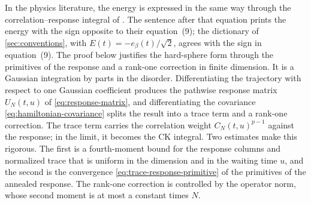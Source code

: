 In the physics literature, the energy is expressed in the same way through the correlation--response integral of \cite[Equation~(5)]{ck1993}. The sentence after that equation prints the energy with the sign opposite to their equation~(9); the dictionary of \cref{sec:conventions}, with $E(t)=-e_\beta(t)/\sqrt2$, agrees with the sign in equation~(9). The proof below justifies the hard-sphere form through the primitives of the response and a rank-one correction in finite dimension. It is a Gaussian integration by parts in the disorder. Differentiating the trajectory with respect to one Gaussian coefficient produces the pathwise response matrix $U_N(t,u)$ of \eqref{eq:response-matrix}, and differentiating the covariance \eqref{eq:hamiltonian-covariance} splits the result into a trace term and a rank-one correction. The trace term carries the correlation weight $C_N(t,u)^{p-1}$ against the response; in the limit, it becomes the CK integral. Two estimates make this rigorous. The first is a fourth-moment bound for the response columns and normalized trace that is uniform in the dimension and in the waiting time $u$, and the second is the convergence \eqref{eq:trace-response-primitive} of the primitives of the annealed response. The rank-one correction is controlled by the operator norm, whose second moment is at most a constant times $N$.

